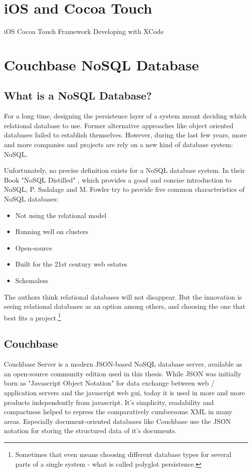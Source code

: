 \section{iOS and Cocoa Touch}

iOS Cocoa Touch Framework 
Developing with XCode

\section{Couchbase NoSQL Database}


\subsection{What is a NoSQL Database?}

For a long time, designing the persistence layer of a system meant deciding which relational database to use. Former alternative approaches like object oriented databases failed to establish themselves. 
However, during the last few years, more and more companies and projects are rely on a new kind of database system: NoSQL.

Unfortunately, no precise definition exists for a NoSQL database system. In their Book "NoSQL Distilled" \cite{nosqldistilled}, which provides a good and concise introduction to NoSQL, P. Sadalage and M. Fowler try to provide five common characteristics of NoSQL databases:

\begin{itemize}
\item Not using the relational model
\item Running well on clusters
\item Open-source
\item Built for the 21st century web estates
\item Schemaless
\end{itemize}

The authors think relational databases will not disappear. But the innovation is seeing relational databases as an option among others, and choosing the one that best fits a project.\footnote{Sometimes that even means choosing different database types for several parts of a single system - what is called polyglot persistence.} 

\subsection{Couchbase}

Couchbase Server \cite{couchbase} is a modern JSON-based NoSQL database server, available as an open-source community edition used in this thesis. While JSON was initially born as "Javascript Object Notation" for data exchange between web / application servers and the javascript web gui, today it is used in more and more products independently from javascript. It's simplicity, readability and compactness helped to repress the comparatively cumbersome XML in many areas. Especially document-oriented databases like Couchbase use the JSON notation for storing the structured data of it's documents.

